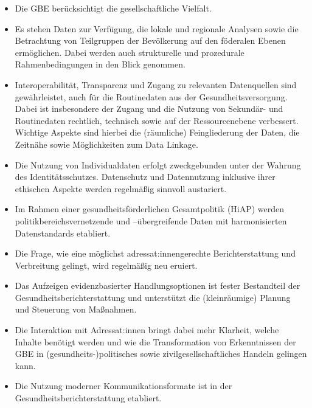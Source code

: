 \documentclass{article}
\begin{document}
\begin{itemize}
\item Die GBE berücksichtigt die gesellschaftliche Vielfalt.


\item Es stehen Daten zur Verfügung, die lokale und regionale Analysen sowie die Betrachtung von Teilgruppen der Bevölkerung auf den föderalen Ebenen ermöglichen. Dabei werden auch strukturelle und prozedurale Rahmenbedingungen in den Blick genommen.


\item Interoperabilität, Transparenz und Zugang zu relevanten Datenquellen sind gewährleistet, auch für die Routinedaten aus der Gesundheitsversorgung. Dabei ist insbesondere der Zugang und die Nutzung von Sekundär- und Routinedaten rechtlich, technisch sowie auf der Ressourcenebene verbessert. Wichtige Aspekte sind hierbei die (räumliche) Feingliederung der Daten, die Zeitnähe sowie Möglichkeiten zum Data Linkage.


\item Die Nutzung von Individualdaten erfolgt zweckgebunden unter der Wahrung des Identitätsschutzes. Datenschutz und Datennutzung inklusive ihrer ethischen Aspekte werden regelmäßig sinnvoll austariert.


\item Im Rahmen einer gesundheitsförderlichen Gesamtpolitik (HiAP) werden politikbereichsvernetzende und –übergreifende Daten mit harmonisierten Datenstandards etabliert.


\item Die Frage, wie eine möglichst adressat:innengerechte Berichterstattung und Verbreitung gelingt, wird regelmäßig neu eruiert.


\item Das Aufzeigen evidenzbasierter Handlungsoptionen ist fester Bestandteil der Gesundheitsberichterstattung und unterstützt die (kleinräumige) Planung und Steuerung von Maßnahmen.


\item Die Interaktion mit Adressat:innen bringt dabei mehr Klarheit, welche Inhalte benötigt werden und wie die Transformation von Erkenntnissen der GBE in (gesundheits-)politisches sowie zivilgesellschaftliches Handeln gelingen kann.


\item Die Nutzung moderner Kommunikationsformate ist in der Gesundheitsberichterstattung etabliert.


\end{itemize}
\end{document}
